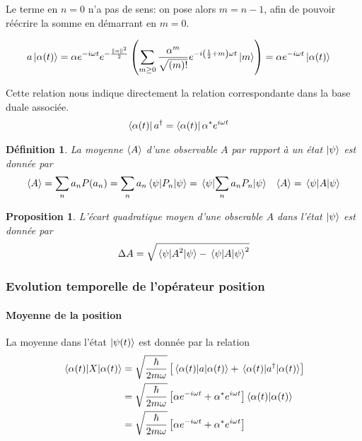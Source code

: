\documentclass[11pt,oneside,a4paper]{article}
\newcommand{\h}{\ensuremath{\hbar}}
\newtheorem{definition}[theorem]{Définition}
\newtheorem{property}[theorem]{Proposition}
\begin{document}
Le terme en $n = 0$ n'a pas de sens: on pose alors $m=n-1$, afin de pouvoir réécrire la somme en démarrant en $m = 0$.

\begin{align}
  a\ket{\alpha(t)} &= \alpha e^{-i\omega t}e^{-\frac{\norm{\alpha}^2}{2}}\left(\sum_{m\geq 0}\frac{\alpha^{m}}{\sqrt{(m)!}}e^{-i\left(\frac{1}{2}+m    \right)\omega t}\ket{m}\right) = \alpha e^{-i\omega t}\ket{\alpha(t)}
\end{align}

Cette relation nous indique directement la relation correspondante dans la base duale associée. 
\begin{align}
  \bra{\alpha(t)}a^\dagger &= \bra{\alpha(t)}\alpha^*e^{i\omega t}
\end{align}

\begin{definition}
  La moyenne $\expval{A}$ d'une observable $A$ par rapport à un état $\ket{\psi}$ est donnée par
  \begin{align}
    \expval{A} &= \sum_n a_nP(a_n) = \sum_n a_n \expval{P_n}{\psi} = \expval{\sum_n a_nP_n}{\psi} &\expval{A} = \expval{A}{\psi} 
  \end{align}
\end{definition}

\begin{property}
  L'écart quadratique moyen d'une obserable $A$ dans l'état $\ket{\psi}$ est donnée par
  \begin{align}
    \label{ecart quadratique moyen}
    \Delta A = \sqrt{\expval{A^2}{\psi} - \expval{A}{\psi}^2}
  \end{align}
\end{property}

\subsubsection{Evolution temporelle de l'opérateur position}
\label{Evolution temporelle de l'opérateur position}

\paragraph{Moyenne de la position}

La moyenne dans l'état $\ket{\psi(t)}$ est donnée par la relation
\begin{align}
  \expval{X}{{\alpha(t)}} &= \sqrt{\frac{\h}{2m\omega}}\left[\expval{a}{\alpha(t)}+\expval{a^\dagger}{\alpha(t)}\right]\\
  &= \sqrt{\frac{\h}{2m\omega}} \left[\alpha e^{-i\omega t}+\alpha^*e^{i\omega t}\right]\braket{\alpha(t)}\\
  &= \sqrt{\frac{\h}{2m\omega}} \left[\alpha e^{-i\omega t}+\alpha^*e^{i\omega t}\right]
\end{align}
\end{document}
